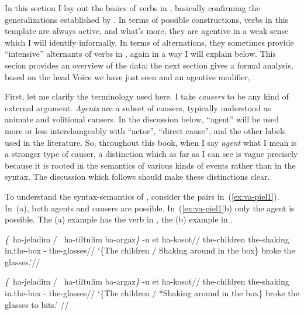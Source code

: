 {In this section I lay out the basics of verbs in {\tpie}, basically confirming the generalizations established by \cite{doron03}. In terms of possible constructions, verbs in this template are always active, and what's more, they are agentive in a weak sense which I will identify informally. In terms of alternations, they sometimes provide ``intensive'' alternants of verbs in {\tkal}, again in a way I will explain below. This secion provides an overview of the data; the next section gives a formal analysis, based on the head Voice we have just seen and an agentive modifier, {\va}.

First, let me clarify the terminology used here. I take \emph{causers} to be any kind of external argument. \emph{Agents} are a subset of causers, typically understood as animate and volitional causers. In the discussion below, ``agent'' will be used more or less interchangeably with ``actor'', ``direct cause'', and the other labels used in the literature. So, throughout this book, when I say \emph{agent} what I mean is a stronger type of causer, a distinction which as far as I can see is vague precisely because it is rooted in the semantics of various kinds of events rather than in the syntax. The discussion which follows should make these distinctions clear.

To understand the syntax-semantics of {\tpie}, consider the pairs in~(\ref{ex:va-piel1}). In~(\nextx a), both agents and causers are possible. In~(\ref{ex:va-piel1}b) only the agent is possible. The (a) example has the verb in {\tkal}, the (b) example in {\tpie}.

\pex \label{ex:va-piel1}
	\a \begingl
		\gla \emph{\{}\cmark~ha-jeladim / \cmark~ha-tiltulim ba-argaz\emph{\}} -u et ha-kosot//
		\glb \phantom{\{\cmark~}the-children {} \phantom{\cmark~}the-shaking in.the-box -  the-glasses//
		\glft `\{The children / Shaking around in the box\} broke the glasses.'//
		\endgl
	
	\a \begingl
		\gla \emph{\{}\cmark~ha-jeladim / \xmark~ha-tiltulim ba-argaz\emph{\}} -u et ha-kosot//
		\glb \phantom{\{\cmark~}the-children {} \phantom{\xmark~}the-shaking in.the-box -  the-glasses//
		\glft `\{The children / *Shaking around in the box\} broke the glasses to bits.' //
		\endgl
\xe

%	

}
